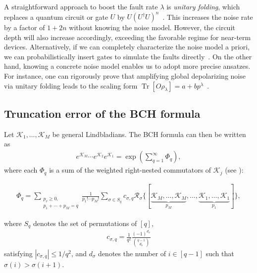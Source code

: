 \documentclass[aps,pra,reprint,groupedaddress,floatfix]{revtex4-2}
\newcommand{\mc}{\mathcal}
\newcommand{\sz}[1]{{\color{blue} Shuo: #1}}
\begin{document}
A straightforward approach to boost the fault rate $\lambda$ is \textit{unitary folding}, which replaces a quantum circuit or gate $U$ by $U(U^\dagger U)^n$~\cite{giurgica-tiron_digital_2020, DumitrescuEtAl2018, HeEtAl2020}. This increases the noise rate by a factor of $1+2n$ without knowing the noise model. However, the circuit depth will also increase accordingly, exceeding the favorable regime for near-term devices. Alternatively, if we can completely characterize the noise model a priori, we can probabilistically insert gates to simulate the faults directly~\cite {li2017efficient}. On the other hand, knowing a concrete noise model enables us to adopt more precise ansatzes. For instance, one can rigorously prove that amplifying global depolarizing noise via unitary folding leads to the scaling form $\operatorname{Tr}[O\rho_\lambda]=a+bp^\lambda$~\cite{giurgica-tiron_digital_2020}.




\subsection{Truncation error of the BCH formula}
\label{sec:bch-truncate}
Let $\mc K_1, \ldots, \mc K_M$ be general Lindbladians. The BCH formula can then be written as
\begin{align}
\label{eq:def-bch}
 	e^{\mc K_M}\cdots e^{\mc K_2}e^{\mc K_1} = \exp(\sum_{q = 1}^{\infty} \Phi_q),
\end{align}
where each $\Phi_q$ is a sum of the weighted right-nested commutators of $\mc K_j$ (see \citet{arnal2021note}):
\begin{widetext}
\begin{align}
\label{eq:bch}
 	\Phi_q
    =
    \sum_{\substack{p_v \ge 0,\\p_1+\cdots+p_M = q}}
    \frac{1}{p_1!\cdots p_M!}
    \sum_{\sigma\in S_q} c_{\sigma, q}\mc R_{\sigma}
    \{[\underbrace{\mc K_M, \ldots, \mc K_M}_{p_M},
    \ldots,
    \underbrace{\mc K_1, \ldots, \mc K_1}_{p_1}]\},
\end{align}
\end{widetext}
where $S_q$ denotes the set of permutations of $[q]$, \begin{align}
\label{eq:def-c-sigma}
    c_{\sigma, q}=\frac{1}{q^2}\frac{(-1)^{d_{\sigma}}}{\binom{q-1}{d_\sigma}} 
\end{align} satisfying $|c_{\sigma, q}|\le 1/q^2$, and $d_{\sigma}$ denotes the number of $i\in[q-1]$ such that $\sigma(i)>\sigma(i+1)$.
\end{document}
